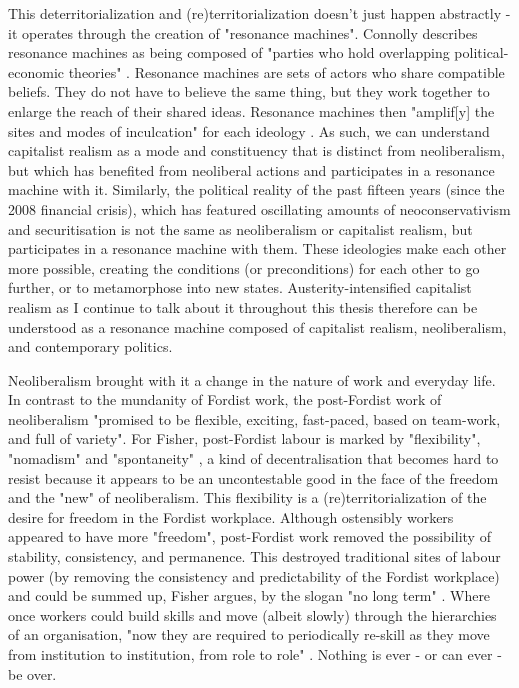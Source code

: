 This deterritorialization and (re)territorialization doesn't just happen abstractly - it operates through the creation of "resonance machines". Connolly describes resonance machines as being composed of "parties who hold overlapping political-economic theories" \citep[p. 68]{connolly_fragility_2013}. Resonance machines are sets of actors who share compatible beliefs. They do not have to believe the same thing, but they work together to enlarge the reach of their shared ideas. Resonance machines then "amplif[y] the sites and modes of inculcation" for each ideology \citeyearpar[p. 68]{connolly_fragility_2013}. As such, we can understand capitalist realism as a mode and constituency that is distinct from neoliberalism, but which has benefited from neoliberal actions and participates in a resonance machine with it. Similarly, the political reality of the past  fifteen years (since the 2008 financial crisis), which has featured oscillating amounts of neoconservativism and securitisation is not the same as neoliberalism or capitalist realism, but participates in a resonance machine with them. These ideologies make each other more possible, creating the conditions (or preconditions) for each other to go further, or to metamorphose into new states. Austerity-intensified capitalist realism as I continue to talk about it throughout this thesis therefore can be understood as a resonance machine composed of capitalist realism, neoliberalism, and contemporary politics. 

Neoliberalism brought with it a change in the nature of work and everyday life. In contrast to the mundanity of Fordist work, the post-Fordist work of neoliberalism "promised to be flexible, exciting, fast-paced, based on team-work, and full of variety". For Fisher, post-Fordist labour is marked by "flexibility", "nomadism" and "spontaneity" \citeyearpar[p. 28]{fisher_capitalist_2009}, a kind of decentralisation that becomes hard to resist because it appears to be an uncontestable good in the face of the freedom and the "new" of neoliberalism. This flexibility is a (re)territorialization of the desire for freedom in the Fordist workplace. Although ostensibly workers appeared to have more "freedom", post-Fordist work removed the possibility of stability, consistency, and permanence. This destroyed traditional sites of labour power (by removing the consistency and predictability of the Fordist workplace) and could be summed up, Fisher argues, by the slogan "no long term" \citep[p. 36]{fisher_capitalist_2009}. Where once workers could build skills and move (albeit slowly) through the hierarchies of an organisation, "now they are required to periodically re-skill as they move from institution to institution, from role to role" \citep[p. 36]{fisher_capitalist_2009}. Nothing is ever - or can ever - be over.

